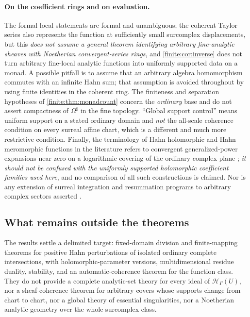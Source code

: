 \documentclass[11pt,letterpaper]{article}
\theoremstyle{definition}
\theoremstyle{remark}
\newcommand{\HH}{\mathscr H}
\newcommand{\sh}{^{\sharp}}
\numberwithin{equation}{section}
\begin{document}
\paragraph{On the coefficient rings and on evaluation.}
The formal local statements are formal and unambiguous; the coherent Taylor series also represents the function at sufficiently small surcomplex displacements, but this \emph{does not assume a general theorem identifying arbitrary fine-analytic sheaves with Noetherian convergent-series rings}, and \cref{finite:cor:inverse} does not turn arbitrary fine-local analytic functions into uniformly supported data on a monad. A possible pitfall is to assume that an arbitrary algebra homomorphism commutes with an infinite Hahn sum; that assumption is avoided throughout by using finite identities in the coherent ring. The finiteness and separation hypotheses of \cref{finite:thm:monadcount} concern the \emph{ordinary} base and do not assert compactness of $\Omega\sh$ in the fine topology. ``Global support control'' means uniform support on a stated ordinary domain and \emph{not} the all-scale coherence condition on every surreal affine chart, which is a different and much more restrictive condition. Finally, the terminology of Hahn holomorphic and Hahn meromorphic functions in the literature refers to convergent generalized-power expansions near zero on a logarithmic covering of the ordinary complex plane \cite{finite:MullerStrohmaier}; \emph{it should not be confused with the uniformly supported holomorphic coefficient families used here}, and no comparison of all such constructions is claimed. Nor is any extension of surreal integration and resummation programs to arbitrary complex sectors asserted \cite{finite:CostinEhrlich}.

\subsection{What remains outside the theorems}
\label{finite:sec:outside}

The results settle a delimited target: fixed-domain division and finite-mapping theorems for positive Hahn perturbations of isolated ordinary complete intersections, with holomorphic-parameter versions, multidimensional residue duality, stability, and an automatic-coherence theorem for the function class. They do not provide a complete analytic-set theory for every ideal of $\HH_\Gamma(U)$, nor a sheaf-coherence theorem for arbitrary covers whose supports change from chart to chart, nor a global theory of essential singularities, nor a Noetherian analytic geometry over the whole surcomplex class.
\end{document}
